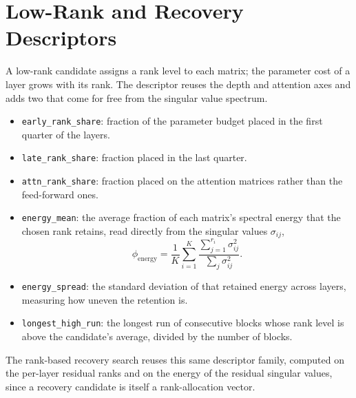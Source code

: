 \documentclass[10pt,twocolumn]{article}
\newcommand{\code}[1]{\texttt{\small #1}}
\begin{document}
\section{Low-Rank and Recovery Descriptors}
A low-rank candidate assigns a rank level to each matrix; the parameter cost of a layer grows with its rank. The descriptor reuses the depth and attention axes and adds two that come for free from the singular value spectrum.
\begin{itemize}[leftmargin=1.1em,itemsep=1pt,topsep=1pt]
\item \code{early\_rank\_share}: fraction of the parameter budget placed in the first quarter of the layers.
\item \code{late\_rank\_share}: fraction placed in the last quarter.
\item \code{attn\_rank\_share}: fraction placed on the attention matrices rather than the feed-forward ones.
\item \code{energy\_mean}: the average fraction of each matrix's spectral energy that the chosen rank retains, read directly from the singular values $\sigma_{ij}$,
\[
\phi_{\mathrm{energy}} = \frac{1}{K}\sum_{i=1}^{K} \frac{\sum_{j=1}^{r_i}\sigma_{ij}^2}{\sum_{j}\sigma_{ij}^2}.
\]
\item \code{energy\_spread}: the standard deviation of that retained energy across layers, measuring how uneven the retention is.
\item \code{longest\_high\_run}: the longest run of consecutive blocks whose rank level is above the candidate's average, divided by the number of blocks.
\end{itemize}

The rank-based recovery search reuses this same descriptor family, computed on the per-layer residual ranks and on the energy of the residual singular values, since a recovery candidate is itself a rank-allocation vector.
\end{document}
